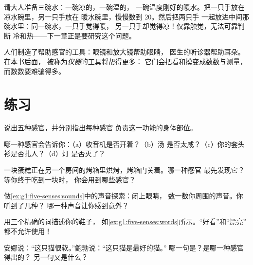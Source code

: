 \begin{example}\label{ex:g1:five-senses:bowls}
请大人准备三碗水：一碗凉的，一碗温的，
一碗温度刚好的暖水。把一只手放在凉水碗里，另一只手放在
暖水碗里，慢慢数到 $20$。然后把两只手
一起放进中间那碗水里：同一碗水，一只手觉得暖，
另一只手却觉得凉！仅靠触觉，无法可靠判断
冷和热——下一章正是要研究这个问题。
\end{example}

\begin{remark}[感官的帮手]\label{rem:g1:five-senses:tools}
人们制造了帮助感官的工具：眼镜和放大镜帮助眼睛，
医生的听诊器帮助耳朵。在本书后面，
被称为\emph{仪器}的工具将帮得更多：
它们会把看和摸变成数数与测量，
而数数要难骗得多。
\end{remark}

\section{练习}

\begin{exercise}[$\star$]\label{exo:g1:five-senses:1}
说出五种感官，并分别指出每种感官
负责这一功能的身体部位。
\end{exercise}

\begin{exercise}[$\star$]\label{exo:g1:five-senses:2}
哪一种感官会告诉你：（a）收音机是否开着？（b）汤
是否太咸？（c）你的套头衫是否扎人？（d）灯
是否灭了？
\end{exercise}

\begin{exercise}[$\star$]\label{exo:g1:five-senses:3}
一块蛋糕正在另一个房间的烤箱里烘烤，烤箱门关着。哪一种感官
最先发现它？等你终于吃到一块时，
你会用到哪些感官？
\end{exercise}

\begin{exercise}[$\star$]\label{exo:g1:five-senses:4}
做\cref{ex:g1:five-senses:sounds}中的声音探索：闭上眼睛，
数一数你周围的声音。你听到了几种？
哪一种声音让你感到意外？
\end{exercise}

\begin{exercise}[$\star$]\label{exo:g1:five-senses:5}
用三个精确的词描述你的鞋子，
如\cref{ex:g1:five-senses:words}所示。“好看”和“漂亮”
都不允许使用！
\end{exercise}

\begin{exercise}[$\star$]\label{exo:g1:five-senses:6}
安娜说：“这只猫很软。”鲍勃说：“这只猫是最好的猫。”
哪一句是？是哪一种感官得出的？
另一句又是什么？
\end{exercise}


